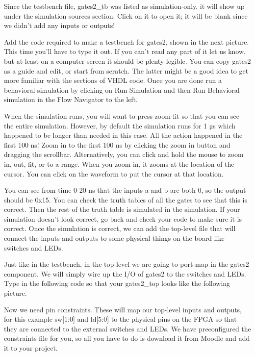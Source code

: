 
Since the testbench file, gates2\_tb was listed as simulation-only, it will show up under the
simulation sources section.
Click on it to open it; it will be blank since we didn't add any inputs or outputs!


Add the code required to make a testbench for gates2, shown in the next picture.
This time you'll have to type it out.
If you can't read any part of it let us know, but at least on a computer screen it should be
plenty legible.
You can copy gates2 as a guide and edit, or start from scratch.
The latter might be a good idea to get more familiar with the sections of VHDL code.
Once you are done run a behavioral simulation by clicking on Run Simulation and then Run
Behavioral simulation in the Flow Navigator to the left.


When the simulation runs, you will want to press zoom-fit so that you can see the entire
simulation.
However, by default the simulation runs for 1 μs which happened to be longer than needed in
this case.
All the action happened in the first 100 ns!
Zoom in to the first 100 ns by clicking the zoom in button and dragging the scrollbar.
Alternatively, you can click and hold the mouse to zoom in, out, fit, or to a range.
When you zoom in, it zooms at the location of the cursor.
You can click on the waveform to put the cursor at that location.


You can see from time 0-20 ns that the inputs a and b are both 0, so the output should be 0x15.
You can check the truth tables of all the gates to see that this is correct.
Then the rest of the truth table is simulated in the simulation.
If your simulation doesn't look correct, go back and check your code to make sure it is correct.
Once the simulation is correct, we can add the top-level file that will connect the inputs and
outputs to some physical things on the board like switches and LEDs.


Just like in the testbench, in the top-level we are going to port-map in the gates2 component.
We will simply wire up the I/O of gates2 to the switches and LEDs.
Type in the following code so that your gates2\_top looks like the following picture.


Now we need pin constraints.
These will map our top-level inputs and outputs, for this example sw[1:0] and ld[5:0] to the
physical pins on the FPGA so that they are connected to the external switches and LEDs.
We have preconfigured the constraints file for you, so all you have to do is download it from
Moodle and add it to your project.

